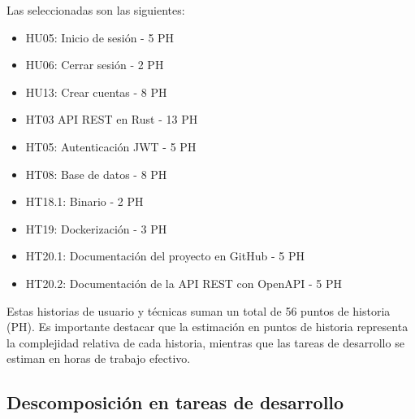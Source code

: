 Las seleccionadas son las siguientes:
\begin{itemize}
    \item HU05: Inicio de sesión - 5 PH
    \item HU06: Cerrar sesión - 2 PH
    \item HU13: Crear cuentas - 8 PH
    \item HT03 API REST en Rust - 13 PH
    \item HT05: Autenticación JWT - 5 PH
    \item HT08: Base de datos - 8 PH
    \item HT18.1: Binario - 2 PH
    \item HT19: Dockerización - 3 PH
    \item HT20.1: Documentación del proyecto en GitHub - 5 PH
    \item HT20.2: Documentación de la API REST con OpenAPI - 5 PH
\end{itemize}

Estas historias de usuario y técnicas suman un total de 56 puntos de historia (PH). Es importante destacar que la estimación en puntos de historia representa la complejidad relativa de cada historia, mientras que las tareas de desarrollo se estiman en horas de trabajo efectivo.

\subsection{Descomposición en tareas de desarrollo}

